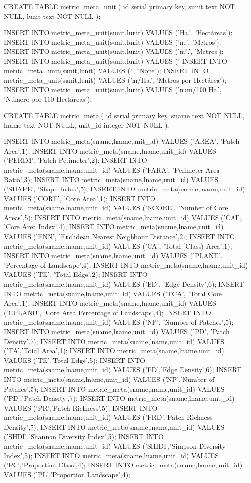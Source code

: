 \lstset{caption=Crear una función para calcular el IDW (I),label= IDW1}
\begin{SQL}
CREATE TABLE metric_meta_unit (
	id serial primary key,
	sunit text NOT NULL,
	lunit text NOT NULL
);
                                                    
INSERT INTO metric_meta_unit(sunit,lunit) VALUES ('Ha.', 'Hectáreas');
INSERT INTO metric_meta_unit(sunit,lunit) VALUES ('m.', 'Metros');
INSERT INTO metric_meta_unit(sunit,lunit) VALUES ('m².', 'Metros');
INSERT INTO metric_meta_unit(sunit,lunit) VALUES ('%
INSERT INTO metric_meta_unit(sunit,lunit) VALUES ('', 'None');
INSERT INTO metric_meta_unit(sunit,lunit) VALUES ('m/Ha.', 'Metros por Hectárea');
INSERT INTO metric_meta_unit(sunit,lunit) VALUES ('num/100 Ha.', 'Número por 100 Hectáreas');


CREATE TABLE metric_meta (
	id serial primary key,
	sname text NOT NULL,
	lname text NOT NULL,
	unit_id integer NOT NULL
);

INSERT INTO metric_meta(sname,lname,unit_id) VALUES ('AREA', 'Patch Area',1);
INSERT INTO metric_meta(sname,lname,unit_id) VALUES ('PERIM', 'Patch Perimeter',2);
INSERT INTO metric_meta(sname,lname,unit_id) VALUES ('PARA', 'Perimeter Area Ratio',3);
INSERT INTO metric_meta(sname,lname,unit_id) VALUES ('SHAPE', 'Shape Index',5);
INSERT INTO metric_meta(sname,lname,unit_id) VALUES ('CORE', 'Core Area',1);
INSERT INTO metric_meta(sname,lname,unit_id) VALUES ('NCORE', 'Number of Core Areas',5);
INSERT INTO metric_meta(sname,lname,unit_id) VALUES ('CAI', 'Core Area Index',4);
INSERT INTO metric_meta(sname,lname,unit_id) VALUES ('ENN', 'Euclidean Nearest Neighbour Distance',2);
INSERT INTO metric_meta(sname,lname,unit_id) VALUES ('CA', 'Total (Class) Area',1);
INSERT INTO metric_meta(sname,lname,unit_id) VALUES ('PLAND', 'Percentage of Landscape',4);
INSERT INTO metric_meta(sname,lname,unit_id) VALUES ('TE', 'Total Edge',2);
INSERT INTO metric_meta(sname,lname,unit_id) VALUES ('ED', 'Edge Density',6);
INSERT INTO metric_meta(sname,lname,unit_id) VALUES ('TCA', 'Total Core Area',1);
INSERT INTO metric_meta(sname,lname,unit_id) VALUES ('CPLAND', 'Core Area Percentage of Landscape',4);
INSERT INTO metric_meta(sname,lname,unit_id) VALUES ('NP', 'Number of Patches',5);
INSERT INTO metric_meta(sname,lname,unit_id) VALUES ('PD', 'Patch Density',7);
INSERT INTO metric_meta(sname,lname,unit_id) VALUES ('TA','Total Area',1);
INSERT INTO metric_meta(sname,lname,unit_id) VALUES ('TE','Total Edge',5);
INSERT INTO metric_meta(sname,lname,unit_id) VALUES ('ED','Edge Density',6);
INSERT INTO metric_meta(sname,lname,unit_id) VALUES ('NP','Number of Patches',5);
INSERT INTO metric_meta(sname,lname,unit_id) VALUES ('PD','Patch Density',7);
INSERT INTO metric_meta(sname,lname,unit_id) VALUES ('PR','Patch Richness',5);
INSERT INTO metric_meta(sname,lname,unit_id) VALUES ('PRD','Patch Richness Density',7);
INSERT INTO metric_meta(sname,lname,unit_id) VALUES ('SHDI','Shannon Diversity Index',5);
INSERT INTO metric_meta(sname,lname,unit_id) VALUES ('SHIDI','Simpson Diversity Index',5);
INSERT INTO metric_meta(sname,lname,unit_id) VALUES ('PC','Proportion Class',4);
INSERT INTO metric_meta(sname,lname,unit_id) VALUES ('PL','Proportion Landscape',4);




\end{SQL}
